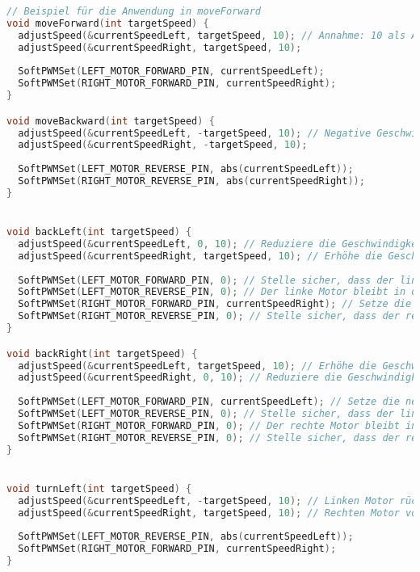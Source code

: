 \documentclass{vorlage-design-main}
\begin{document}
\begin{lstlisting}[language={C++}]
// Beispiel für die Anwendung in moveForward
void moveForward(int targetSpeed) {
  adjustSpeed(&currentSpeedLeft, targetSpeed, 10); // Annahme: 10 als Anpassungsschritt
  adjustSpeed(&currentSpeedRight, targetSpeed, 10);
  
  SoftPWMSet(LEFT_MOTOR_FORWARD_PIN, currentSpeedLeft);
  SoftPWMSet(RIGHT_MOTOR_FORWARD_PIN, currentSpeedRight);
}

void moveBackward(int targetSpeed) {
  adjustSpeed(&currentSpeedLeft, -targetSpeed, 10); // Negative Geschwindigkeit für Rückwärts
  adjustSpeed(&currentSpeedRight, -targetSpeed, 10);
  
  SoftPWMSet(LEFT_MOTOR_REVERSE_PIN, abs(currentSpeedLeft));
  SoftPWMSet(RIGHT_MOTOR_REVERSE_PIN, abs(currentSpeedRight));
}


void backLeft(int targetSpeed) {
  adjustSpeed(&currentSpeedLeft, 0, 10); // Reduziere die Geschwindigkeit des linken Motors auf 0
  adjustSpeed(&currentSpeedRight, targetSpeed, 10); // Erhöhe die Geschwindigkeit des rechten Motors
  
  SoftPWMSet(LEFT_MOTOR_FORWARD_PIN, 0); // Stelle sicher, dass der linke Motor nicht vorwärts läuft
  SoftPWMSet(LEFT_MOTOR_REVERSE_PIN, 0); // Der linke Motor bleibt in diesem Fall gestoppt
  SoftPWMSet(RIGHT_MOTOR_FORWARD_PIN, currentSpeedRight); // Setze die neue Geschwindigkeit für den rechten Motor
  SoftPWMSet(RIGHT_MOTOR_REVERSE_PIN, 0); // Stelle sicher, dass der rechte Motor nicht rückwärts läuft
}

void backRight(int targetSpeed) {
  adjustSpeed(&currentSpeedLeft, targetSpeed, 10); // Erhöhe die Geschwindigkeit des linken Motors
  adjustSpeed(&currentSpeedRight, 0, 10); // Reduziere die Geschwindigkeit des rechten Motors auf 0
  
  SoftPWMSet(LEFT_MOTOR_FORWARD_PIN, currentSpeedLeft); // Setze die neue Geschwindigkeit für den linken Motor
  SoftPWMSet(LEFT_MOTOR_REVERSE_PIN, 0); // Stelle sicher, dass der linke Motor nicht rückwärts läuft
  SoftPWMSet(RIGHT_MOTOR_FORWARD_PIN, 0); // Der rechte Motor bleibt in diesem Fall gestoppt
  SoftPWMSet(RIGHT_MOTOR_REVERSE_PIN, 0); // Stelle sicher, dass der rechte Motor nicht rückwärts läuft
}


void turnLeft(int targetSpeed) {
  adjustSpeed(&currentSpeedLeft, -targetSpeed, 10); // Linken Motor rückwärts für Linksdrehung
  adjustSpeed(&currentSpeedRight, targetSpeed, 10); // Rechten Motor vorwärts
  
  SoftPWMSet(LEFT_MOTOR_REVERSE_PIN, abs(currentSpeedLeft));
  SoftPWMSet(RIGHT_MOTOR_FORWARD_PIN, currentSpeedRight);
}



\end{lstlisting}
\end{document}
